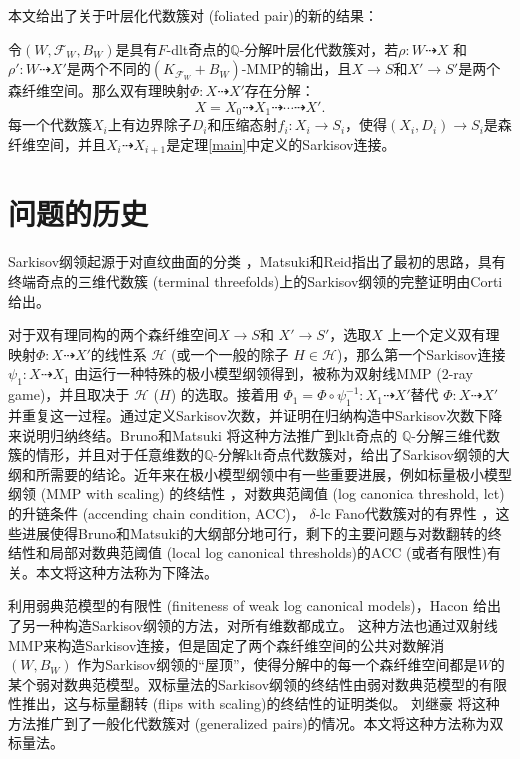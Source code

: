 本文给出了关于叶层化代数簇对 (foliated pair)的新的结果：
\begin{theorem}\label{mainf}
  令$(W,\mathcal{F}_{W},B_{W})$是具有$F$-dlt奇点的$\mathbb{Q}$-分解叶层化代数簇对，若$\rho:W\dashrightarrow X$ 和$\rho':W \dashrightarrow X'$是两个不同的$(K_{\mathcal{F}_{W}}+B_{W})$-MMP的输出，且$X \to S$和$X' \to S'$是两个森纤维空间。那么双有理映射$\Phi:X \dashrightarrow X'$存在分解：
  \[ X=X_{0}\dashrightarrow X_{1}\dashrightarrow \cdots \dashrightarrow X'. \]
  每一个代数簇$X_{i}$上有边界除子$D_{i}$和压缩态射$f_{i}:X_{i}\to S_{i}$，使得$(X_{i},D_{i})\to S_{i}$是森纤维空间，并且$X_{i} \dashrightarrow X_{i+1}$是定理\ref{main}中定义的Sarkisov连接。
\end{theorem}

\section{问题的历史}
Sarkisov纲领起源于对直纹曲面的分类 \cite{sarkisovBIRATIONALAUTOMORPHISMSCONIC1981,sarkisovCONICBUNDLESTRUCTURES1983}，Matsuki和Reid指出了最初的思路，具有终端奇点的三维代数簇 (terminal threefolds)上的Sarkisov纲领的完整证明由Corti\cite{cortiFactoringBirationalMaps}给出。 

对于双有理同构的两个森纤维空间$X\to S$和 $X'\to S'$，选取$X$ 上一个定义双有理映射$\Phi:X \dashrightarrow X'$的线性系 $\mathcal{H}$ (或一个一般的除子 $H \in \mathcal{H}$)，那么第一个Sarkisov连接 $\psi_1:X\dashrightarrow X_1$ 由运行一种特殊的极小模型纲领得到，被称为双射线MMP ($2$-ray game)，并且取决于 $\mathcal{H}$ ($H$) 的选取。接着用 $\Phi_{1}=\Phi\circ \psi_1^{-1}: X_1 \dashrightarrow X'$替代 $\Phi:X\dashrightarrow X'$并重复这一过程。通过定义Sarkisov次数，并证明在归纳构造中Sarkisov次数下降来说明归纳终结。Bruno和Matsuki \cite{brunoLogSarkisovProgram1995} 将这种方法推广到klt奇点的 $\mathbb{Q}$-分解三维代数簇的情形，并且对于任意维数的$\mathbb{Q}$-分解klt奇点代数簇对，给出了Sarkisov纲领的大纲和所需要的结论。近年来在极小模型纲领中有一些重要进展，例如标量极小模型纲领 (MMP with scaling) 的终结性 \cite{BCHM10}，对数典范阈值 (log canonica threshold, lct)的升链条件 (accending chain condition, ACC)\cite{HMX14}， $\delta$-lc Fano代数簇对的有界性 \cite{Bir19,birkarSingularitiesLinearSystems2020}，这些进展使得Bruno和Matsuki的大纲部分地可行，剩下的主要问题与对数翻转的终结性和局部对数典范阈值 (local log canonical thresholds)的ACC (或者有限性)有关。本文将这种方法称为下降法。


利用弱典范模型的有限性\cite{BCHM10} (finiteness of weak log canonical models)，Hacon \cite{haconMinimalModelProgram2012} 给出了另一种构造Sarkisov纲领的方法，对所有维数都成立。
这种方法也通过双射线MMP来构造Sarkisov连接，但是固定了两个森纤维空间的公共对数解消 $(W,B_W)$ 作为Sarkisov纲领的``屋顶''，使得分解中的每一个森纤维空间都是$W$的某个弱对数典范模型。双标量法的Sarkisov纲领的终结性由弱对数典范模型的有限性推出，这与标量翻转 (flips with scaling)的终结性的证明类似。
刘继豪 \cite{liuSarkisovProgramGeneralized2021} 将这种方法推广到了一般化代数簇对 (generalized pairs)的情况。本文将这种方法称为双标量法。


